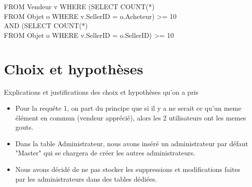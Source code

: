 \documentclass[a4paper,11pt]{article}
\begin{document}
FROM Vendeur v WHERE (SELECT COUNT(*) \\
FROM Objet o WHERE v.SellerID = o.Acheteur) >= 10  \\
AND (SELECT COUNT(*) \\
FROM Objet o WHERE v.SellerID = o.SellerID) >= 10 \\


\section{Choix et hypothèses}

Explications et justifications des choix et hypothèses qu'on a pris

\begin{itemize}
	\item Pour la requête 1, on part du principe que si il y a ne serait ce qu'un meme élément en commun (vendeur apprécié), alors les 2 utilisateurs ont les memes gouts.
    \item Dans la table Administrateur, nous avons inséré un administrateur par défaut "Master" qui se chargera de créer les autres administrateurs.
    \item Nous avons décidé de ne pas stocker les suppressions et modifications faites par les administrateurs dans des tables dédiées.
   
    
\end{itemize}
\end{document}
